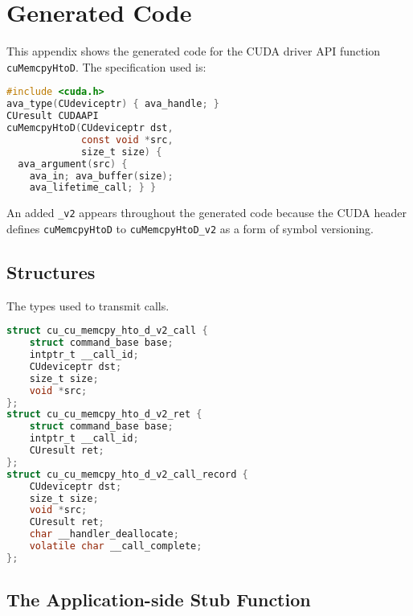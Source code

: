
\section{\Compiler Generated Code}
\label{app:cuMemcpyHtoD-code}

This appendix shows the generated code for the CUDA driver API function \lstinline|cuMemcpyHtoD|.
The specification used is:

\begin{lstlisting}[language=C,columns=flexible]
#include <cuda.h>
ava_type(CUdeviceptr) { ava_handle; }
CUresult CUDAAPI
cuMemcpyHtoD(CUdeviceptr dst,
             const void *src,
             size_t size) {
  ava_argument(src) {
    ava_in; ava_buffer(size);
    ava_lifetime_call; } }
\end{lstlisting}

An added \lstinline|_v2| appears throughout the generated code because the CUDA header defines \lstinline|cuMemcpyHtoD| to \lstinline|cuMemcpyHtoD_v2| as a form of symbol versioning.



\subsection{Structures}

The types used to transmit calls.


\begin{lstlisting}[language=C,columns=flexible]
struct cu_cu_memcpy_hto_d_v2_call {
    struct command_base base;
    intptr_t __call_id;
    CUdeviceptr dst;
    size_t size;
    void *src;
};
struct cu_cu_memcpy_hto_d_v2_ret {
    struct command_base base;
    intptr_t __call_id;
    CUresult ret;
};
struct cu_cu_memcpy_hto_d_v2_call_record {
    CUdeviceptr dst;
    size_t size;
    void *src;
    CUresult ret;
    char __handler_deallocate;
    volatile char __call_complete;
};
\end{lstlisting}

\subsection{The Application-side Stub Function}

